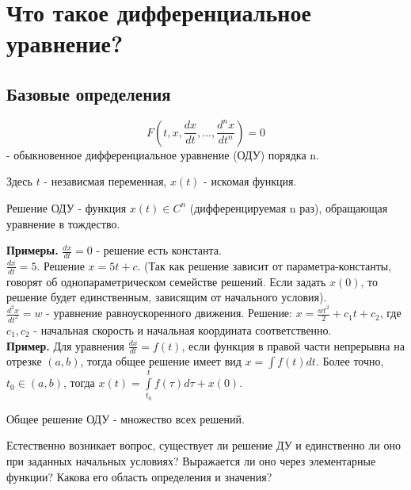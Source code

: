 \section{Что такое дифференциальное уравнение?}
\subsection{Базовые определения}
\begin{defin}
\begin{equation}
    F\left(t,x,\frac{dx}{dt},...,\frac{d^n x}{dt^n}\right)=0 \label{ODE}
\end{equation}
- обыкновенное дифференциальное уравнение (ОДУ) порядка n.
\end{defin}
Здесь $t$ - независмая переменная,  $x(t)$ - искомая функция.
\begin{defin}
Решение ОДУ - функция $x(t)\in C^n$ (дифференцируемая n раз), обращающая
уравнение в тождество.
\end{defin}
\textbf{Примеры.} $\frac{dx}{dt}=0 $ - решение есть константа.\\
$\frac{dx}{dt}=5$. Решение $x=5t+c$.
(Так как решение зависит от параметра-константы, говорят об однопараметрическом
семействе решений. Если задать $x(0)$, то решение будет единственным, 
зависящим от начального условия).\\
$\frac{d^2 x}{dt^2}=w$ - уравнение равноускоренного 
движения. Решение: $x=\frac{wt^2}{2}+c_1t+c_2$, где  $c_1,c_2$ - начальная 
скорость и начальная координата соответственно. \\
\textbf{Пример.} Для уравнения $\frac{dx}{dt} =f(t)$, если 
функция в правой части непрерывна на отрезке $(a,b)$, тогда общее решение
имеет вид $x=\int f(t)dt$. Более точно, $t_0\in(a,b)$, тогда
$x(t)=\int\limits^t_{t_0}f(\tau)d\tau+x(0)$.
\begin{defin}
Общее решение ОДУ - множество всех решений.
\end{defin}
Естественно возникает вопрос, существует ли решение ДУ и единственно ли оно
при заданных начальных условиях? Выражается ли оно через элементарные функции?
Какова его область определения и значения?

